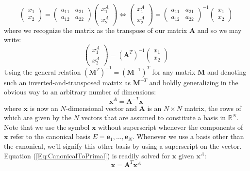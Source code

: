 \begin{equation}
 \begin{pmatrix} 
  x_1 \\
  x_2
 \end{pmatrix}
 =
 \begin{pmatrix} 
  a_{11} & a_{21} \\
  a_{12} & a_{22}
 \end{pmatrix}
 \begin{pmatrix} 
  x_1^A \\
  x_2^A
 \end{pmatrix} 
 \Leftrightarrow
 \begin{pmatrix} 
  x_1^A \\
  x_2^A
 \end{pmatrix} 
 = 
 \begin{pmatrix} 
  a_{11} & a_{21} \\
  a_{12} & a_{22}
 \end{pmatrix}^{-1} 
 \begin{pmatrix} 
  x_1 \\
  x_2
 \end{pmatrix} 
\end{equation}
where we recognize the matrix as the transpose of our matrix $\mathbf{A}$ and so we may write:
\begin{equation}
 \begin{pmatrix} 
  x_1^A \\
  x_2^A 
 \end{pmatrix}
 =
 (\mathbf{A}^T)^{-1}
 \begin{pmatrix} 
  x_1 \\
  x_2
 \end{pmatrix}
\end{equation}
Using the general relation $(\mathbf{M}^T)^{-1} = (\mathbf{M}^{-1})^T$ for any matrix $\mathbf{M}$ and denoting such an inverted-and-transposed matrix as $\mathbf{M}^{-T}$ and boldly generalizing in the obvious way to an arbitrary number of dimensions:
\begin{equation}
\label{Eq:CanonicalToPrimal}
\boxed{
 \mathbf{x}^A
 =
 \mathbf{A}^{-T} \mathbf{x}
}
\end{equation}
where $\mathbf{x}$ is now an $N$-dimensional vector and $\mathbf{A}$ is an $N \times N$ matrix, the rows of which are given by the $N$ vectors that are assumed to constitute a basis in $\mathbb{R}^N$. Note that we use the symbol $\mathbf{x}$ without superscript whenever the components of $\mathbf{x}$ refer to the canonical basis $E = \mathbf{e}_1, \ldots, \mathbf{e}_N$. Whenever we use a basis other than the canonical, we'll signify this other basis by using a superscript on the vector. Equation (\ref{Eq:CanonicalToPrimal}) is readily solved for $\mathbf{x}$ given $\mathbf{x}^A$:
\begin{equation}
\label{Eq:PrimalToCanonical}
\boxed
{
 \mathbf{x}
 =
 \mathbf{A}^T  \mathbf{x}^A
}
\end{equation}

